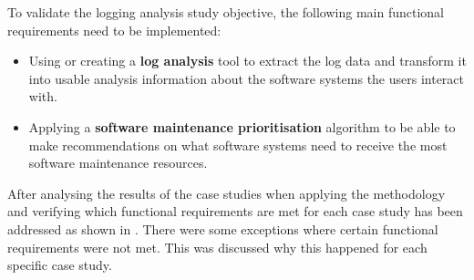 \begin{enumerate}[label=\textbf{\Roman*.}]
	 To validate the logging analysis study objective, the following main functional requirements need to be implemented:
	 \begin{itemize}
		\item Using or creating a \textbf{log analysis} tool to extract the log data and transform it into usable analysis information about the software systems the users interact with.
		\item Applying a \textbf{software maintenance prioritisation} algorithm to be able to make recommendations on what software systems need to receive the most software maintenance resources.
	 \end{itemize}

	 After analysing the results of the case studies when applying the methodology and verifying which functional requirements are met for each case study has been addressed as shown in . There were some exceptions where certain functional requirements were not met. This was discussed why this happened for each specific case study.
\end{enumerate}

